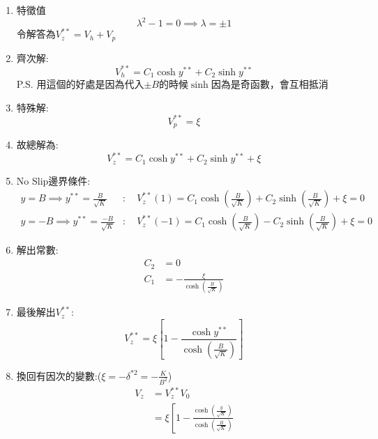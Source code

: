\documentclass[../main.tex]{subfiles}
\begin{document}
\begin{itemize}
\begin{enumerate}
    此為二階常係數非齊次ODE
    假設$-\delta^{\ast 2}= \xi$，方便描述
    \item 特徵值
    \begin{equation}
      \lambda^2 -1 = 0 \implies \lambda = \pm 1
    \end{equation}
    令解答為$V_z^{\ast\ast} = V_h + V_p$
    \item 齊次解:
    \begin{equation}
      V_h^{\ast\ast} = C_1 \cosh y^{\ast\ast} + C_2 \sinh y^{\ast\ast}
    \end{equation}
    P.S. 用這個的好處是因為代入$\pm B$的時候$\sinh$因為是奇函數，會互相抵消
    \item 特殊解:
    \begin{equation}
      V_p^{\ast\ast} = \xi
    \end{equation}
    \item 故總解為:
    \begin{equation}
      V_z^{\ast\ast} = C_1 \cosh y^{\ast\ast} + C_2 \sinh y^{\ast\ast} + \xi
    \end{equation}
    \item No Slip邊界條件:
    \begin{align}
      y=B \implies y^{\ast\ast} = \frac{B}{\sqrt{K}} &: \quad V_z^{\ast\ast}(1) = C_1 \cosh\left(\frac{B}{\sqrt{K}}\right)  + C_2 \sinh \left(\frac{B}{\sqrt{K}}\right)  + \xi = 0\\
      y=-B \implies y^{\ast\ast} = \frac{-B}{\sqrt{K}} &: \quad V_z^{\ast\ast}(-1) = C_1 \cosh \left(\frac{B}{\sqrt{K}}\right)  - C_2 \sinh \left(\frac{B}{\sqrt{K}}\right)  + \xi = 0
    \end{align}
    \item 解出常數:
    \begin{align}
      C_2 &= 0\\
      C_1 &= -\frac{\xi}{\cosh\left(\frac{B}{\sqrt{K}}\right)}
    \end{align}
    \item 最後解出$V_z^{\ast\ast}$:
    \begin{equation}
      V_z^{\ast\ast} = \xi \left[
        1 - \frac{\cosh y^{\ast\ast}}{\cosh\left(\frac{B}{\sqrt{K}}\right)}
      \right]
    \end{equation}
  \item 換回有因次的變數:($\xi= -\delta^{\ast 2} = -\frac{K}{B^2}$)
    \begin{align}
      V_z &= V_z^{\ast\ast} V_0 \nonumber\\
          &= \xi \left[
        1 - \frac{\cosh\left(\frac{y}{\sqrt{K}}\right)}{\cosh\left(\frac{B}{\sqrt{K}}\right)}

\end{align}
\end{enumerate}
\end{itemize}
\end{document}
